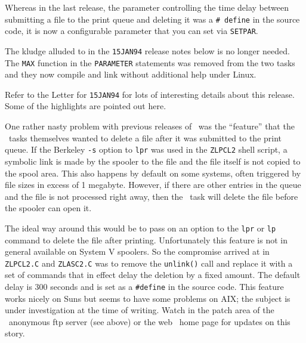 Whereas in the last release, the parameter controlling the time delay
between submitting a file to the print queue and deleting it was a {\tt\#
define} in the source code, it is now a configurable parameter that you
can set via {\tt SETPAR}.

\medskip{}

The kludge alluded to in the {\tt 15JAN94} release notes below
is no longer needed.  The {\tt MAX} function in the {\tt PARAMETER}
statements was removed from the two tasks and they now compile and link
without additional help under Linux.


\medskip{}

Refer to the \AIPS Letter for {\tt 15JAN94} for lots of interesting
details about this release.  Some of the highlights are pointed out here.

\medskip{}

One rather nasty problem with previous releases of \AIPS\ was the
``feature'' that the \aips\ tasks themselves wanted to delete a file after
it was submitted to the print queue.  If the Berkeley {\tt -s} option
to {\tt lpr} was used in the {\tt ZLPCL2} shell script, a symbolic link is
made by the spooler to the file and the file itself is not copied to the
spool area.  This also happens by default on some systems, often triggered
by file sizes in excess of 1 megabyte.  However, if there are other
entries in the queue and the file is not processed right away, then the
\aips\ task will delete the file before the spooler can open it.

The ideal way around this would be to pass on an option to the {\tt lpr}
or {\tt lp} command to delete the file after printing.  Unfortunately this
feature is not in general available on System V spoolers.  So the
compromise arrived at in {\tt ZLPCL2.C} and {\tt ZLASC2.C} was to remove
the {\tt unlink()} call and replace it with a set of commands that in
effect delay the deletion by a fixed amount.  The default delay is 300
seconds and is set as a {\tt \#define} in the source code.  This feature
works nicely on Suns but seems to have some problems on AIX; the subject
is under investigation at the time of writing.  Watch in the patch area of
the \AIPS\ anonymous ftp server (see above) or the web \AIPS\ home page
for updates on this story.\medskip

